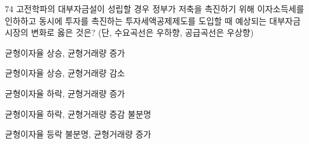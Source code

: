\begin{question}{74}
고전학파의 대부자금설이 성립할 경우 정부가 저축을 촉진하기 위해 이자소득세를 인하하고 동시에 투자를 촉진하는 투자세액공제제도를 도입할 때 예상되는 대부자금 시장의 변화로 옳은 것은? (단, 수요곡선은 우하향, 공급곡선은 우상향)
\begin{choices}
  \item 균형이자율 상승, 균형거래량 증가
  \item 균형이자율 상승, 균형거래량 감소
  \item 균형이자율 하락, 균형거래량 증가
  \item 균형이자율 하락, 균형거래량 증감 불분명
  \item 균형이자율 등락 불분명, 균형거래량 증가
\end{choices}
\end{question}
